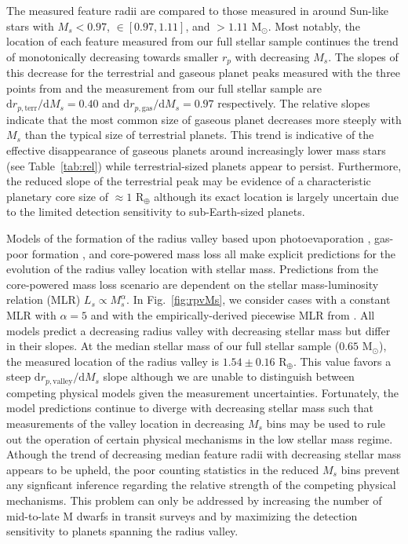 \documentclass[twocolumn]{emulateapj}
\begin{document}
The measured feature radii are compared to those measured in \cite{fulton18} around Sun-like stars with
$M_s <0.97$, $\in [0.97,1.11]$, and $>1.11$ M$_{\odot}$.
Most notably, the location of each feature measured from our full stellar sample continues the trend of monotonically
decreasing towards smaller $r_p$ with decreasing $M_s$. The slopes of this decrease for the terrestrial and gaseous
planet peaks measured with the three points from \cite{fulton18} and the measurement from our full stellar sample
are $\text{d}r_{p,\text{terr}} / \text{d}M_s = 0.40$ and $\text{d}r_{p,\text{gas}} / \text{d}M_s = 0.97$
respectively. The relative slopes indicate that the most common size of
gaseous planet decreases more steeply with $M_s$ than the typical size of terrestrial planets. This trend
is indicative of the effective disappearance of gaseous planets around increasingly lower mass stars
(see Table~\ref{tab:rel}) while terrestrial-sized planets appear to persist.
Furthermore, the reduced slope of the terrestrial peak may be evidence of
a characteristic planetary core size of $\approx 1$ R$_{\oplus}$ although its exact location is largely uncertain
due to the limited detection sensitivity to sub-Earth-sized planets.   

Models of the formation of the radius valley based upon photoevaporation \citep{wu19}, gas-poor formation \citep{lopez18},
and core-powered mass loss \citep{gupta19b} all make explicit predictions for the evolution of the radius valley location
with stellar mass. Predictions from the core-powered mass loss scenario are dependent on the stellar mass-luminosity
relation (MLR) $L_s \propto M_s^{\alpha}$. In Fig.~\ref{fig:rpvMs}, we consider cases with a constant MLR with $\alpha=5$
\citep{gupta19b} and with the empirically-derived piecewise MLR from \cite{eker18}. All models predict a decreasing
radius valley with decreasing stellar mass but differ in their slopes. 
At the median stellar mass of our full stellar sample ($0.65$ M$_{\odot}$), the measured location of the radius valley is
$1.54\pm 0.16$ R$_{\oplus}$. This value favors a steep $\text{d}r_{p,\text{valley}} / \text{d}M_s$ slope although we are
unable to distinguish between competing physical models given the measurement uncertainties.
Fortunately, the model predictions continue to diverge
with decreasing stellar mass such that measurements of the valley location in decreasing $M_s$ bins may be used to
rule out the operation of certain physical mechanisms in the low stellar mass regime. Athough the trend of decreasing
median feature radii with decreasing stellar mass appears to be upheld, the poor counting statistics in the reduced
$M_s$ bins prevent any signficant inference regarding the relative strength of the competing physical mechanisms.
This problem can only be addressed by increasing the number of mid-to-late M dwarfs in transit surveys and by maximizing
the detection sensitivity to planets spanning the radius valley.
\end{document}
